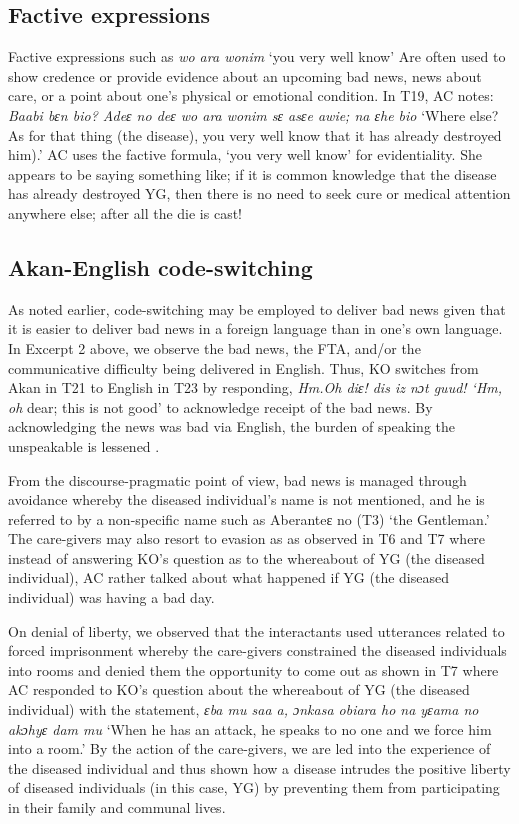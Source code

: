 \documentclass[output=paper,colorlinks,citecolor=brown]{langscibook}
\begin{document}
\subsection{Factive expressions}\label{sec:obeng:4.5}

Factive expressions such as \textit{wo ara wonim} ‘you very well know’ Are often used to show credence or provide evidence about an upcoming bad news, news about care, or a point about one’s physical or emotional condition. In T19, AC notes: \textit{Baabi bɛn bio? Adeɛ no deɛ wo ara wonim sɛ asɛe awie; na ɛhe bio} ‘Where else? As for that thing (the disease), you very well know that it has already destroyed him).’ AC uses the factive formula, ‘you very well know’ for evidentiality. She appears to be saying something like; if it is common knowledge that the disease has already destroyed YG, then there is no need to seek cure or medical attention anywhere else; after all the die is cast! 

\subsection{Akan-English code-switching}\label{sec:obeng:4.6}

As noted earlier, code-switching may be employed to deliver bad news given that it is easier to deliver bad news in a foreign language than in one’s own language. In Excerpt 2 above, we observe the bad news, the FTA, and/or the communicative difficulty being delivered in English. Thus, KO switches from Akan in T21 to English in T23 by responding, \textit{Hm.Oh diɛ! dis iz nɔt guud! ‘Hm, oh } dear; this is not good’ to acknowledge receipt of the bad news. By acknowledging the news was bad via English, the burden of speaking the unspeakable is lessened \citep{Movahedi1996}. 

From the discourse-pragmatic point of view, bad news is managed through avoidance whereby the diseased individual’s name is not mentioned, and he is referred to by a non-specific name such as Aberanteɛ no (T3) ‘the Gentleman.’ The care-givers may also resort to evasion as as observed in T6 and T7 where instead of answering KO’s question as to the whereabout of YG (the diseased individual), AC rather talked about what happened if YG (the diseased individual) was having a bad day.

On denial of liberty, we observed that the interactants used utterances related to forced imprisonment whereby the care-givers constrained the diseased individuals into rooms and denied them the opportunity to come out as shown in T7 where AC responded to KO’s question about the whereabout of YG (the diseased individual) with the statement, \textit{ɛba mu saa a, ɔnkasa obiara ho na yɛama no akɔhyɛ dam mu} ‘When he has an attack, he speaks to no one and we force him into a room.’ By the action of the care-givers, we are led into the experience of the diseased individual and thus shown how a disease intrudes the positive liberty of diseased individuals (in this case, YG) by preventing them from participating in their family and communal lives.
\end{document}
